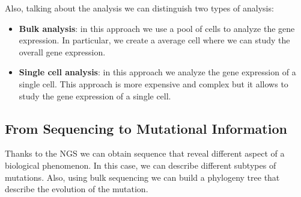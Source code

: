 Also, talking about the analysis we can distinguish two types of analysis:
\begin{itemize}
    \item \textbf{Bulk analysis}: in this approach we use a pool of cells to analyze
          the gene expression. In particular, we create a average cell where we
          can study the overall gene expression.
    \item \textbf{Single cell analysis}: in this approach we analyze the gene
          expression of a single cell. This approach is more expensive and complex
          but it allows to study the gene expression of a single cell.
\end{itemize}
\subsection{From Sequencing to Mutational Information}
Thanks to the NGS we can obtain sequence that reveal different aspect of a
biological phenomenon. In this case, we can describe different subtypes of
mutations. Also, using bulk sequencing we can build a phylogeny tree that
describe the evolution of the mutation.